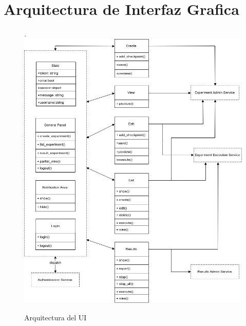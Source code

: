 \section{Arquitectura de Interfaz Grafica}
\begin{figure}[!htb].
    \includegraphics[width=\linewidth]{../figures/d21.jpg}
    \caption{Arquitectura del UI}
    \label{fig:d21}
\end{figure}
\newpage